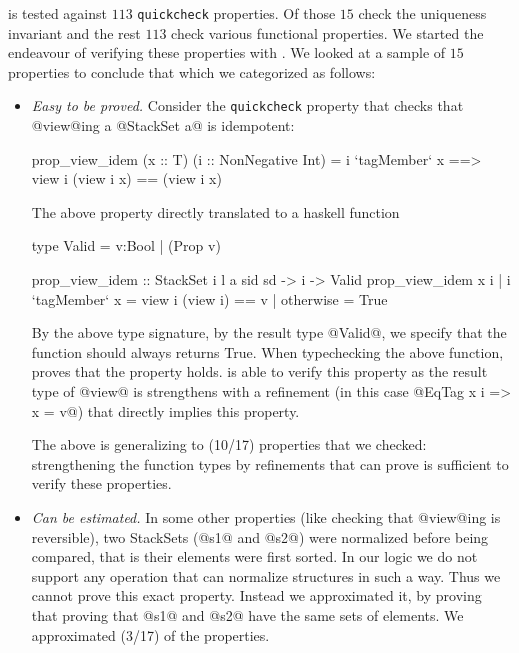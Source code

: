 \lbxmonad is tested against $113$ \texttt{quickcheck} properties.
%
Of those $15$ check the uniqueness invariant 
and the rest $113$ check various functional properties.
%
We started the endeavour of verifying these properties with \toolname.
%
We looked at a sample of $15$ properties to conclude that
which we categorized as follows:
\begin{itemize}
\item\emph{Easy to be proved.}
Consider the \texttt{quickcheck} property that checks that @view@ing 
a @StackSet a@ is idempotent:
\begin{code}
prop_view_idem (x :: T) (i :: NonNegative Int) 
  = i `tagMember` x ==> view i (view i x) == (view i x)
\end{code}
%
The above property directly translated to a haskell function
\begin{code}
type Valid     = {v:Bool | (Prop v) }

prop_view_idem :: StackSet i l a sid sd -> i -> Valid
prop_view_idem x i 
  | i `tagMember` x = view i (view i) == v
  | otherwise       = True
\end{code}
%
By the above type signature,
\ie by the result type @Valid@, 
we specify that the function should always returns True.
%
When typechecking the above function,
\toolname proves that the property holds.
%
\toolname is able to verify this property as the result type of @view@
is strengthens with a refinement 
(in this case @EqTag x i => x = v@) 
that directly implies this property.

The above is generalizing to (10/17) properties that we checked:
strengthening the function types by refinements that \toolname can prove
is sufficient to verify these properties.

\item\emph{Can be estimated.}
In some other properties (like checking that @view@ing is reversible),
two StackSets (@s1@ and @s2@) were normalized before being compared,
that is their elements were first sorted.
%
In our logic we do not support any operation that can normalize structures in such a way.
%
Thus we cannot prove this exact property.
%
Instead we approximated it, by proving that proving that @s1@ and @s2@
have the same sets of elements.
%
We approximated (3/17) of the properties.


\end{itemize}
